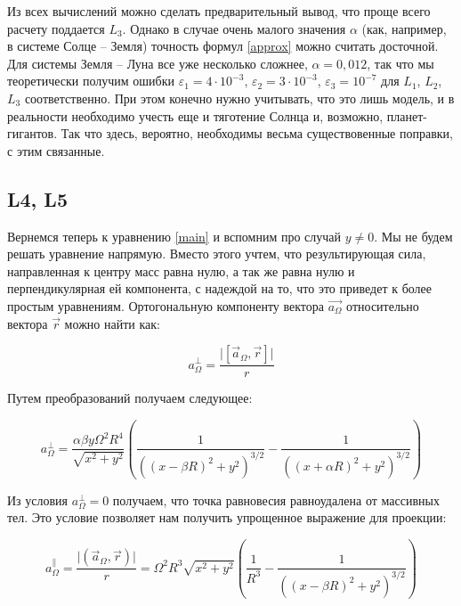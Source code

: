 \documentclass[12pt]{article}
\begin{document}
    \par Из всех вычислений можно сделать предварительный вывод, что проще всего расчету
    поддается $L_3$. Однако в случае очень малого значения $\alpha$ (как, например,
    в системе Солце -- Земля) точность формул \ref{approx} можно считать досточной.
    Для системы Земля -- Луна все уже несколько сложнее, $\alpha = 0{,}012$, так что 
    мы теоретически получим ошибки $\varepsilon_1 = 4\cdot10^{-3}$, 
    $\varepsilon_2 = 3\cdot10^{-3}$, $\varepsilon_3 = 10^{-7}$ 
    для $L_1$, $L_2$, $L_3$ соответственно. При этом конечно нужно учитывать, что
    это лишь модель, и в реальности необходимо учесть еще и тяготение Солнца
    и, возможно, планет-гигантов. Так что здесь, вероятно, необходимы весьма
    существовенные поправки, с этим связанные.

    \subsection{L4, L5}
    Вернемся теперь к уравнению \ref{main} и вспомним про случай $y \neq 0$.
    Мы не будем решать уравнение напрямую. Вместо этого учтем, что результирующая сила,
    направленная к центру масс равна нулю, а так же равна нулю и перпендикулярная ей 
    компонента, с надеждой на то, что это приведет к более простым уравнениям.
    Ортогональную компоненту вектора $\vec{a_{\Omega}}$ относительно
    вектора $\vec{r}$ можно найти как:
    
    \begin{equation}
        a_{\Omega}^{\perp} = \frac{\lvert[\vec{a}_{\Omega}, \vec{r}]\rvert}{r}
    \end{equation}

    Путем преобразований получаем следующее:

    \begin{equation}
        a_{\Omega}^{\perp} = \frac{\alpha\beta y\Omega^2R^4}{\sqrt{x^2 + y^2}}
        \left(\frac{1}{((x - \beta R)^2 + y^2)^{3/2}} - 
        \frac{1}{((x + \alpha R)^2 + y^2)^{3/2}}\right)
        \label{perp}
    \end{equation}

    Из условия $a_{\Omega}^{\perp} = 0$ получаем, что точка равновесия
    равноудалена от массивных тел. Это условие позволяет нам получить 
    упрощенное выражение для проекции:

    \begin{equation}
        a_{\Omega}^{\parallel} = \frac{\lvert (\vec{a}_{\Omega}, \vec{r}) \rvert}
        {r} = \Omega^2R^3\sqrt{x^2 + y^2}\left(\frac{1}{R^3} - \frac{1}
        {((x - \beta R)^2 + y^2)^{3/2}}\right)
        \label{parallel}
    \end{equation}
\end{document}
